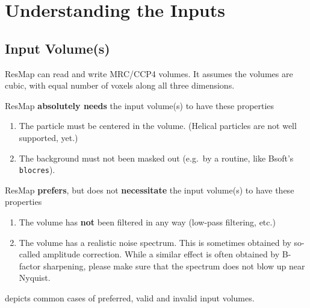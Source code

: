 \documentclass[10pt]{article}
\begin{document}
\section{Understanding the Inputs}
\subsection{Input Volume(s)}
\label{inputVolProperties}
ResMap can read and write MRC/CCP4 volumes. It assumes the volumes are cubic, with equal number of voxels along all three dimensions.

ResMap \textcolor{BrickRed}{\textbf{absolutely needs}} the input volume(s) to have these properties
\begin{enumerate}
	\item The particle must be centered in the volume. (Helical particles are not well supported, yet.)
	\item The background must not been masked out (e.g.~by a routine, like Bsoft's \texttt{blocres}).
\end{enumerate}

ResMap \textcolor{BrickRed}{\textbf{prefers}}, but does not \textcolor{BrickRed}{\textbf{necessitate}} the input volume(s) to have these properties
\begin{enumerate}
	\item The volume has \textbf{not} been filtered in any way (low-pass filtering, etc.)
	\item The volume has a realistic noise spectrum. This is sometimes obtained by so-called amplitude correction. While a similar effect is often obtained by B-factor sharpening, please make sure that the spectrum does not blow up near Nyquist.
\end{enumerate}
 depicts common cases of preferred, valid and invalid input volumes.
\end{document}
